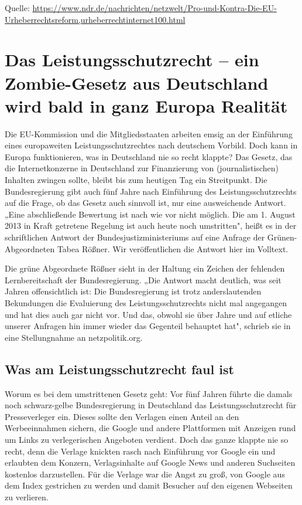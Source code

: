 \documentclass[9pt, a4paper]{scrartcl}
\newcommand{\keineNr}[1][-1]{\addtocounter{linenumber}{#1}}
\newcommand{\seitenzahl}[1][1]{\setcounter{page}{#1}}
\newcommand{\neuerText}[1][1]{\clearpage\seitenzahl\resetZeilenNr}
\begin{document}
{\small Quelle: \url{https://www.ndr.de/nachrichten/netzwelt/Pro-und-Kontra-Die-EU-Urheberrechtsreform,urheberrechtinternet100.html}}

\neuerText\small

\section*{Das Leistungsschutzrecht – ein Zombie-Gesetz aus Deutschland wird bald in ganz Europa Realität}
\begin{zeilenNrZweispaltig}
Die EU-Kommission und die Mitgliedsstaaten arbeiten emsig an der Einführung eines europaweiten Leistungsschutzrechtes nach deutschem Vorbild. Doch kann in Europa funktionieren, was in Deutschland nie so recht klappte? Das Gesetz, das die Internetkonzerne in Deutschland zur Finanzierung von (journalistischen) Inhalten zwingen sollte, bleibt bis zum heutigen Tag ein Streitpunkt. Die Bundesregierung gibt auch fünf Jahre nach Einführung des Leistungsschutzrechts auf die Frage, ob das Gesetz auch sinnvoll ist, nur eine ausweichende Antwort. „Eine abschließende Bewertung ist nach wie vor nicht möglich. Die am 1. August 2013 in Kraft getretene Regelung ist auch heute noch umstritten", heißt es in der schriftlichen Antwort der Bundesjustizministeriums auf eine Anfrage der Grünen-Abgeordneten Tabea Rößner. Wir veröffentlichen die Antwort hier im Volltext.

Die grüne Abgeordnete Rößner sieht in der Haltung ein Zeichen der fehlenden Lernbereitschaft der Bundesregierung. „Die Antwort macht deutlich, was seit Jahren offensichtlich ist: Die Bundesregierung ist trotz anderslautenden Bekundungen die Evaluierung des Leistungsschutzrechts nicht mal angegangen und hat dies auch gar nicht vor. Und das, obwohl sie über Jahre und auf etliche unserer Anfragen hin immer wieder das Gegenteil behauptet hat", schrieb sie in eine Stellungnahme an netzpolitik.org.

\subsection*{Was am Leistungsschutzrecht faul ist}\keineNr
Worum es bei dem umstrittenen Gesetz geht: Vor fünf Jahren führte die damals noch schwarz-gelbe Bundesregierung in Deutschland das Leistungsschutzrecht für Presseverleger ein. Dieses sollte den Verlagen einen Anteil an den Werbeeinnahmen sichern, die Google und andere Plattformen mit Anzeigen rund um Links zu verlegerischen Angeboten verdient. Doch das ganze klappte nie so recht, denn die Verlage knickten rasch nach Einführung vor Google ein und erlaubten dem Konzern, Verlagsinhalte auf Google News und anderen Suchseiten kostenlos darzustellen. Für die Verlage war die Angst zu groß, von Google aus dem Index gestrichen zu werden und damit Besucher auf den eigenen Webseiten zu verlieren.


\end{zeilenNrZweispaltig}
\end{document}

